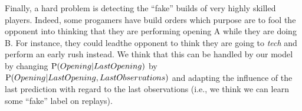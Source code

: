 Finally, a hard problem is detecting the ``fake'' builds of very highly skilled players. Indeed, some progamers have build orders which purpose are to fool the opponent into thinking that they are performing opening A while they are doing B. %
For instance, they could leadthe opponent to think they are going to \textit{tech} 
and perform an early rush instead. We think that this can be handled by our model by changing $\mathrm{P}(Opening|LastOpening)$ by $\mathrm{P}(Opening|LastOpening, LastObservations)$ and adapting the influence of the last prediction with regard to the last observations (i.e., we think we can learn some ``fake'' label on replays).
